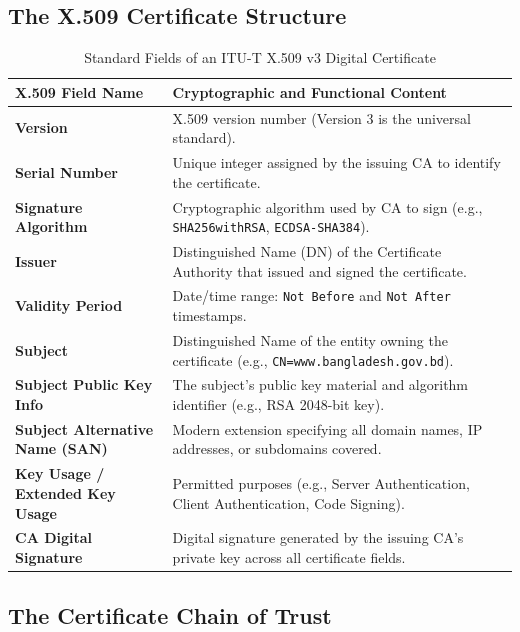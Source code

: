 \subsection{The X.509 Certificate Structure}

\begin{table}[htbp]
\centering
\caption{Standard Fields of an ITU-T X.509 v3 Digital Certificate}
\label{tab:x509_fields}
\begin{tabularx}{\textwidth}{p{4.2cm} X}
\toprule
\textbf{X.509 Field Name} & \textbf{Cryptographic and Functional Content} \\
\midrule
\textbf{Version} & X.509 version number (Version 3 is the universal standard). \\
\textbf{Serial Number} & Unique integer assigned by the issuing CA to identify the certificate. \\
\textbf{Signature Algorithm} & Cryptographic algorithm used by CA to sign (e.g., \texttt{SHA256withRSA}, \texttt{ECDSA-SHA384}). \\
\textbf{Issuer} & Distinguished Name (DN) of the Certificate Authority that issued and signed the certificate. \\
\textbf{Validity Period} & Date/time range: \texttt{Not Before} and \texttt{Not After} timestamps. \\
\textbf{Subject} & Distinguished Name of the entity owning the certificate (e.g., \texttt{CN=www.bangladesh.gov.bd}). \\
\textbf{Subject Public Key Info} & The subject's public key material and algorithm identifier (e.g., RSA 2048-bit key). \\
\textbf{Subject Alternative Name (SAN)} & Modern extension specifying all domain names, IP addresses, or subdomains covered. \\
\textbf{Key Usage / Extended Key Usage} & Permitted purposes (e.g., Server Authentication, Client Authentication, Code Signing). \\
\textbf{CA Digital Signature} & Digital signature generated by the issuing CA's private key across all certificate fields. \\
\bottomrule
\end{tabularx}
\end{table}

\subsection{The Certificate Chain of Trust}

